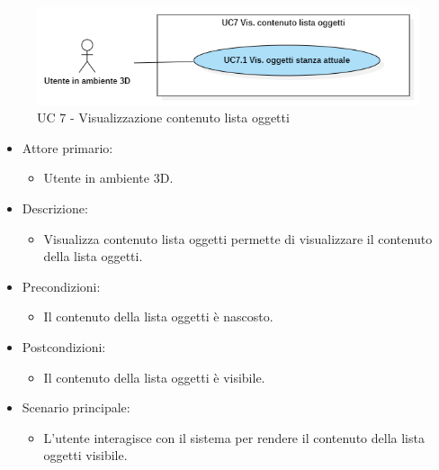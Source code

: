 \begin{figure}[H]
  \renewcommand{\thefigure}{7}
  \includegraphics[width=\linewidth]{./res/images/UC7.png}
  \caption{UC 7 - Visualizzazione contenuto lista oggetti}
  \label{fig:UC 7}
\end{figure}

\begin{itemize}

	\item Attore primario: 
	\begin{itemize}
		\item Utente in ambiente 3D.
	\end{itemize}
	\item Descrizione:
	\begin{itemize}
		\item Visualizza contenuto lista oggetti permette di visualizzare il contenuto della lista oggetti.
	\end{itemize}
	
	\item Precondizioni:
	\begin{itemize}
		\item Il contenuto della lista oggetti è nascosto.
	\end{itemize}
	
	\item Postcondizioni:
	\begin{itemize}
		\item Il contenuto della lista oggetti è visibile.
	\end{itemize}
	
	\item Scenario principale:
	\begin{itemize}
		\item L'utente interagisce con il sistema per rendere il contenuto della lista oggetti visibile.
	\end{itemize}
	
\end{itemize}


